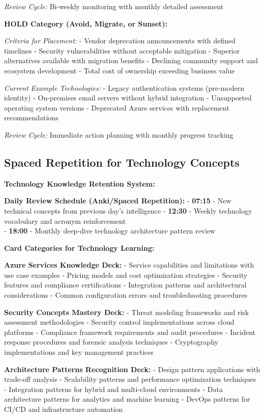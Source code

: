 \documentclass[
  letterpaper,
  DIV=11,
  numbers=noendperiod]{scrartcl}
\begin{document}
\emph{Review Cycle:} Bi-weekly monitoring with monthly detailed
assessment

\textbf{HOLD Category (Avoid, Migrate, or Sunset):}

\emph{Criteria for Placement:} - Vendor deprecation announcements with
defined timelines - Security vulnerabilities without acceptable
mitigation - Superior alternatives available with migration benefits -
Declining community support and ecosystem development - Total cost of
ownership exceeding business value

\emph{Current Example Technologies:} - Legacy authentication systems
(pre-modern identity) - On-premises email servers without hybrid
integration - Unsupported operating system versions - Deprecated Azure
services with replacement recommendations

\emph{Review Cycle:} Immediate action planning with monthly progress
tracking

\subsection{Spaced Repetition for Technology
Concepts}\label{spaced-repetition-for-technology-concepts}

\textbf{Technology Knowledge Retention System:}

\textbf{Daily Review Schedule (Anki/Spaced Repetition):} -
\textbf{07:15} - New technical concepts from previous day's intelligence
- \textbf{12:30} - Weekly technology vocabulary and acronym
reinforcement\\
- \textbf{18:00} - Monthly deep-dive technology architecture pattern
review

\textbf{Card Categories for Technology Learning:}

\textbf{Azure Services Knowledge Deck:} - Service capabilities and
limitations with use case examples - Pricing models and cost
optimization strategies - Security features and compliance
certifications - Integration patterns and architectural considerations -
Common configuration errors and troubleshooting procedures

\textbf{Security Concepts Mastery Deck:} - Threat modeling frameworks
and risk assessment methodologies - Security control implementations
across cloud platforms - Compliance framework requirements and audit
procedures - Incident response procedures and forensic analysis
techniques - Cryptography implementations and key management practices

\textbf{Architecture Patterns Recognition Deck:} - Design pattern
applications with trade-off analysis - Scalability patterns and
performance optimization techniques - Integration patterns for hybrid
and multi-cloud environments - Data architecture patterns for analytics
and machine learning - DevOps patterns for CI/CD and infrastructure
automation
\end{document}
